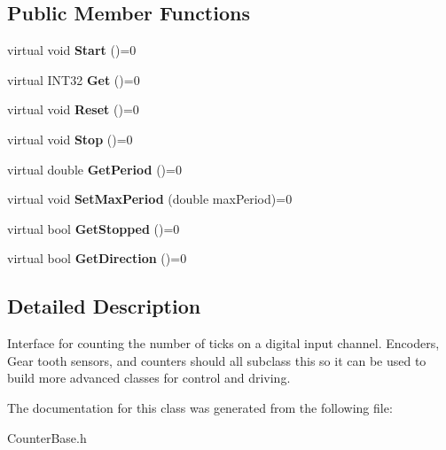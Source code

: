 \subsection*{\-Public \-Member \-Functions}
\begin{DoxyCompactItemize}
\item 
\hypertarget{classCounterBase_ac8c376e198e0402fd46712e323475302}{virtual void {\bfseries \-Start} ()=0}\label{classCounterBase_ac8c376e198e0402fd46712e323475302}

\item 
\hypertarget{classCounterBase_a38288a46837b813ac2e34c07cc4d069c}{virtual \-I\-N\-T32 {\bfseries \-Get} ()=0}\label{classCounterBase_a38288a46837b813ac2e34c07cc4d069c}

\item 
\hypertarget{classCounterBase_afa72871043355ad39e703cfd182aec20}{virtual void {\bfseries \-Reset} ()=0}\label{classCounterBase_afa72871043355ad39e703cfd182aec20}

\item 
\hypertarget{classCounterBase_aea8ddd4a23c5d0fc05164a9b55fb22f8}{virtual void {\bfseries \-Stop} ()=0}\label{classCounterBase_aea8ddd4a23c5d0fc05164a9b55fb22f8}

\item 
\hypertarget{classCounterBase_a1d011fe2873cdf4a0fe624a56f38485b}{virtual double {\bfseries \-Get\-Period} ()=0}\label{classCounterBase_a1d011fe2873cdf4a0fe624a56f38485b}

\item 
\hypertarget{classCounterBase_aecc60bf699c067a61dc6abd6c077d3dc}{virtual void {\bfseries \-Set\-Max\-Period} (double max\-Period)=0}\label{classCounterBase_aecc60bf699c067a61dc6abd6c077d3dc}

\item 
\hypertarget{classCounterBase_a47e66b67064bad970d353918474fc434}{virtual bool {\bfseries \-Get\-Stopped} ()=0}\label{classCounterBase_a47e66b67064bad970d353918474fc434}

\item 
\hypertarget{classCounterBase_a88b315c3e1d4e2f4431d6455c4e4173d}{virtual bool {\bfseries \-Get\-Direction} ()=0}\label{classCounterBase_a88b315c3e1d4e2f4431d6455c4e4173d}

\end{DoxyCompactItemize}


\subsection{\-Detailed \-Description}
\-Interface for counting the number of ticks on a digital input channel. \-Encoders, \-Gear tooth sensors, and counters should all subclass this so it can be used to build more advanced classes for control and driving. 

\-The documentation for this class was generated from the following file\-:\begin{DoxyCompactItemize}
\item 
\-Counter\-Base.\-h\end{DoxyCompactItemize}
